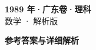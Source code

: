 \documentclass[zihao=-4, a4paper]{ctexart}
\begin{document}
\begin{center}
  {\Large\bfseries 1989 年·广东卷·理科}\\[4pt]
  {\large 数学 · 解析版}
\end{center}
\medskip
{}

\clearpage
{}
\begin{center}{\Large\bfseries 参考答案与详细解析}\end{center}
\medskip

\end{document}
